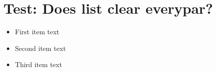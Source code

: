 \documentclass[11pt,a4paper]{article}
\begin{document}
\section{Test: Does list clear everypar?}

\begin{itemize}
  \item First item text
  \item Second item text
  \item Third item text
\end{itemize}
\end{document}
